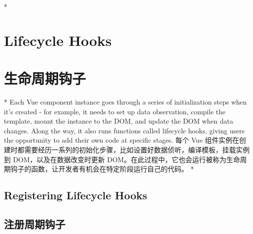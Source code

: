\begin{paracol}{2}

\switchcolumn[0]*%
\section{Lifecycle Hooks}
\switchcolumn
\section{生命周期钩子}
\switchcolumn[0]*%
Each Vue component instance goes through a series of initialization
steps when it's created - for example, it needs to set up data
observation, compile the template, mount the instance to the DOM, and
update the DOM when data changes. Along the way, it also runs functions
called lifecycle hooks, giving users the opportunity to add their own
code at specific stages.
\switchcolumn
每个 Vue
组件实例在创建时都需要经历一系列的初始化步骤，比如设置好数据侦听，编译模板，挂载实例到
DOM，以及在数据改变时更新
DOM。在此过程中，它也会运行被称为生命周期钩子的函数，让开发者有机会在特定阶段运行自己的代码。
\switchcolumn[0]*%
\subsection{Registering Lifecycle Hooks}
\switchcolumn
\subsection{注册周期钩子}



\end{paracol}
